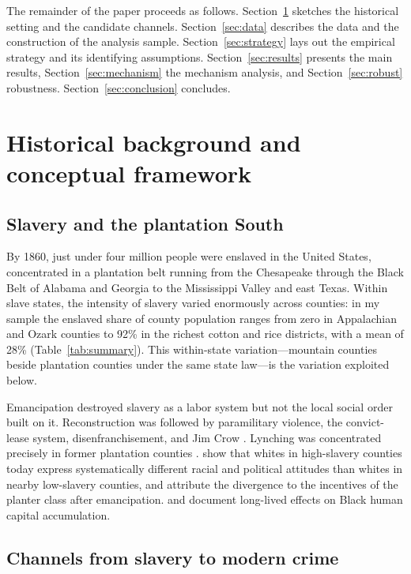 \documentclass[12pt]{article}
\begin{document}
The remainder of the paper proceeds as follows. Section~\ref{sec:background} sketches the historical setting and the candidate channels. Section~\ref{sec:data} describes the data and the construction of the analysis sample. Section~\ref{sec:strategy} lays out the empirical strategy and its identifying assumptions. Section~\ref{sec:results} presents the main results, Section~\ref{sec:mechanism} the mechanism analysis, and Section~\ref{sec:robust} robustness. Section~\ref{sec:conclusion} concludes.

\section{Historical background and conceptual framework}\label{sec:background}

\subsection{Slavery and the plantation South}

By 1860, just under four million people were enslaved in the United States, concentrated in a plantation belt running from the Chesapeake through the Black Belt of Alabama and Georgia to the Mississippi Valley and east Texas. Within slave states, the intensity of slavery varied enormously across counties: in my sample the enslaved share of county population ranges from zero in Appalachian and Ozark counties to 92\% in the richest cotton and rice districts, with a mean of 28\% (Table~\ref{tab:summary}). This within-state variation---mountain counties beside plantation counties under the same state law---is the variation exploited below.

Emancipation destroyed slavery as a labor system but not the local social order built on it. Reconstruction was followed by paramilitary violence, the convict-lease system, disenfranchisement, and Jim Crow \citep{foner1988}. Lynching was concentrated precisely in former plantation counties \citep{tolnay1995}. \citet{abs2016} show that whites in high-slavery counties today express systematically different racial and political attitudes than whites in nearby low-slavery counties, and attribute the divergence to the incentives of the planter class after emancipation. \citet{sacerdote2005} and \citet{bertocchi2014} document long-lived effects on Black human capital accumulation.

\subsection{Channels from slavery to modern crime}
\end{document}
